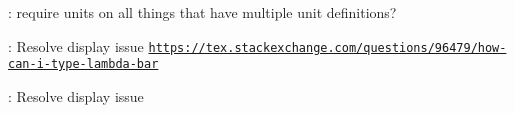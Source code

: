 
\begin{DoxyRefList}
\item[\label{todo__todo000001}%
\Hypertarget{todo__todo000001}%
Module \hyperlink{group___n_i_s_t_const}{N\+I\+S\+T\+Const} ]\+: require units on all things that have multiple unit definitions? 

\+: Resolve  display issue \href{https://tex.stackexchange.com/questions/96479/how-can-i-type-lambda-bar}{\tt https\+://tex.\+stackexchange.\+com/questions/96479/how-\/can-\/i-\/type-\/lambda-\/bar} 

\+: Resolve  display issue 
\end{DoxyRefList}